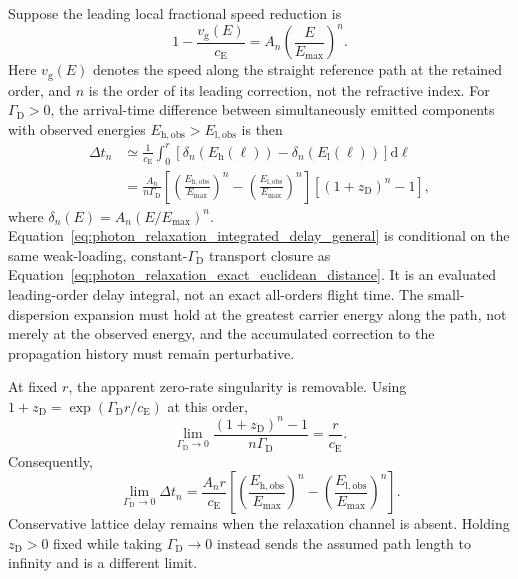 Suppose the leading local fractional speed reduction is
\begin{equation}
    1
    -
    \frac{
        v_{\mathrm g}(E)
    }{
        c_{\mathrm E}
    }
    =
    A_n
    \left(
        \frac{
            E
        }{
            E_{\mathrm{max}}
        }
    \right)^n.
    \label{eq:photon_relaxation_generic_fractional_delay}
\end{equation}
Here \(v_{\mathrm g}(E)\) denotes the speed along the straight reference
path at the retained order, and \(n\) is the order of its leading correction,
not the refractive index. For \(\Gamma_{\mathrm D}>0\), the arrival-time
difference between simultaneously emitted components with observed energies
\(E_{\mathrm{h,obs}}>E_{\mathrm{l,obs}}\) is then
\begin{align}
    \Delta t_n
    &\simeq
    \frac{1}{c_{\mathrm E}}
    \int_0^r
    \left[
        \delta_n
        \left(
            E_{\mathrm h}(\ell)
        \right)
        -
        \delta_n
        \left(
            E_{\mathrm l}(\ell)
        \right)
    \right]
    \mathrm{d}\ell
    \nonumber\\
    &=
    \frac{
        A_n
    }{
        n\Gamma_{\mathrm D}
    }
    \left[
        \left(
            \frac{
                E_{\mathrm{h,obs}}
            }{
                E_{\mathrm{max}}
            }
        \right)^n
        -
        \left(
            \frac{
                E_{\mathrm{l,obs}}
            }{
                E_{\mathrm{max}}
            }
        \right)^n
    \right]
    \left[
        \left(
            1+z_{\mathrm D}
        \right)^n
        -
        1
    \right],
    \label{eq:photon_relaxation_integrated_delay_general}
\end{align}
where
\(\delta_n(E)=A_n(E/E_{\mathrm{max}})^n\).
Equation~\eqref{eq:photon_relaxation_integrated_delay_general} is conditional
on the same weak-loading, constant-\(\Gamma_{\mathrm D}\) transport closure
as Equation~\eqref{eq:photon_relaxation_exact_euclidean_distance}. It is an
evaluated leading-order delay integral, not an exact all-orders flight time.
The small-dispersion expansion must hold at the greatest carrier energy
along the path, not merely at the observed energy, and the accumulated
correction to the propagation history must remain perturbative.

At fixed \(r\), the apparent zero-rate singularity is removable. Using
\(1+z_{\mathrm D}=\exp(\Gamma_{\mathrm D}r/c_{\mathrm E})\) at this order,
\[
    \lim_{\Gamma_{\mathrm D}\to0}
    \frac{(1+z_{\mathrm D})^n-1}{n\Gamma_{\mathrm D}}
    =\frac{r}{c_{\mathrm E}}.
\]
Consequently,
\[
    \lim_{\Gamma_{\mathrm D}\to0}\Delta t_n
    =\frac{A_n r}{c_{\mathrm E}}
     \left[
       \left(\frac{E_{\mathrm{h,obs}}}{E_{\mathrm{max}}}\right)^n
       -\left(\frac{E_{\mathrm{l,obs}}}{E_{\mathrm{max}}}\right)^n
     \right].
\]
Conservative lattice delay remains when the relaxation channel is absent.
Holding \(z_{\mathrm D}>0\) fixed while taking
\(\Gamma_{\mathrm D}\to0\) instead sends the assumed path length to
infinity and is a different limit.


